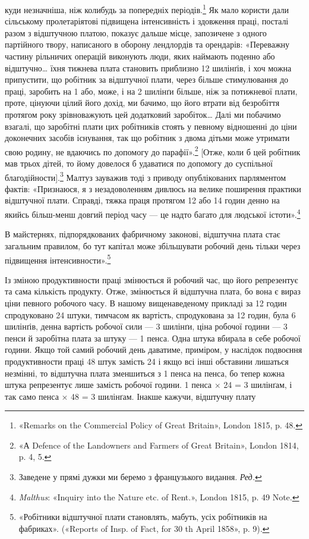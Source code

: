 \parcont{}  %
куди незначніша, ніж колибудь за попередніх періодів.\footnote{
«Remarks on the Commercial Policy of Great Britain», London
1815, p. 48.
} Як
мало користи дали сільському пролетаріятові підвищена інтенсивність
і здовження праці, посталі разом з відштучною платою,
показує дальше місце, запозичене з одного партійного твору,
написаного в оборону лендлордів та орендарів: «Переважну
частину рільничих операцій виконують люди, яких наймають
поденно або відштучно\dots{} їхня тижнева плата становить приблизно
12 шилінґів, і хоч можна припустити, що робітник за відштучної
плати, через більше стимулювання до праці, заробить на 1 або,
може, і на 2 шилінґи більше, ніж за потижневої плати, проте,
цінуючи цілий його дохід, ми бачимо, що його втрати від безробіття
протягом року зрівноважують цей додатковий заробіток\dots{}
Далі ми побачимо взагалі, що заробітні плати цих робітників
стоять у певному відношенні до ціни доконечних засобів існування,
так що робітник з двома дітьми може утримати свою родину,
не вдаючись по допомогу до парафії».\footnote{
«А Defence of the Landowners and Farmers of Great Britain», London
1814, p. 4, 5.
} [Отже, коли б цей
робітник мав трьох дітей, то йому довелося б удаватися по допомогу
до суспільної благодійности].\footnote*{
Заведене у прямі дужки ми беремо з французького видання. \emph{Ред.}
} Малтуз зауважив тоді з
приводу опублікованих парляментом фактів: «Признаюся, я з
незадоволенням дивлюсь на велике поширення практики відштучної
плати. Справді, тяжка праця протягом 12 або 14 годин
денно на якийсь більш-менш довгий період часу — це надто багато
для людської істоти».\footnote{
\emph{Malthus}: «Inquiry into the Nature etc. of Rent.», London 1815,
p. 49 Note.
}

В майстернях, підпорядкованих фабричному законові, відштучна
плата стає загальним правилом, бо тут капітал може збільшувати
робочий день тільки через підвищення інтенсивности».\footnote{
«Робітники відштучної плати становлять, мабуть,  усіх робітників
на фабриках». («Reports of Insp. of Fact, for 30 th April
1858», p. 9).
}

Із зміною продуктивности праці змінюється й робочий час,
що його репрезентує та сама кількість продукту. Отже, змінюється
й відштучна плата, бо вона є вираз ціни певного робочого
часу. В нашому вищенаведеному прикладі за 12 годин спродуковано
24 штуки, тимчасом як вартість, спродукована за 12 годин,
була 6 шилінґів, денна вартість робочої сили — 3 шилінґи,
ціна робочої години — 3 пенси й заробітна плата за штуку —
1 пенса. Одна штука вбирала в себе  робочої години. Якщо
той самий робочий день даватиме, приміром, у наслідок подвоєння
продуктивности праці 48 штук замість 24 і якщо всі інші
обставини лишаться незмінні, то відштучна плата зменшиться
з 1 пенса на  пенса, бо тепер кожна штука репрезентує лише
 замість  робочої години. 1 пенса × 24 = 3 шилінґам, і так
само  пенса × 48 = 3 шилінґам. Інакше кажучи, відштучну плату
\parbreak{}  %
